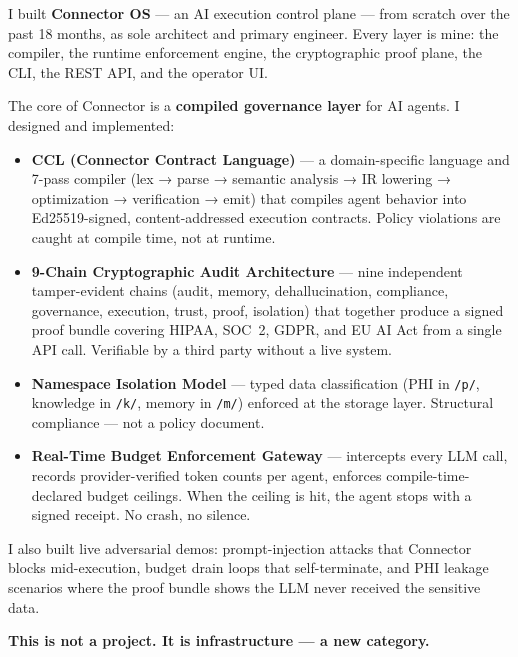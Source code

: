 \documentclass[10pt,a4paper]{article}
\newcommand{\qblock}[2]{%
  \vspace{8pt}
  \noindent
  \begin{tcolorbox}[qbase,
    colback=CSoft,
    title={\small\bfseries\color{CBlue} #1},
    attach boxed title to top left={yshift=-2mm,xshift=6pt},
    boxed title style={colback=CBlue,arc=2pt,boxrule=0pt,
      fonttitle=\small\bfseries\color{white}}]
  #2
  \end{tcolorbox}
}
\begin{document}
\qblock{Q3 — Products you have built and launched, and your role}{

I built \textbf{Connector OS} — an AI execution control plane — from scratch over the past 18
months, as sole architect and primary engineer. Every layer is mine: the compiler, the runtime
enforcement engine, the cryptographic proof plane, the CLI, the REST API, and the operator UI.

The core of Connector is a \textbf{compiled governance layer} for AI agents.
I designed and implemented:

\begin{itemize}
  \item \textbf{CCL (Connector Contract Language)} — a domain-specific language and 7-pass
        compiler (lex → parse → semantic analysis → IR lowering → optimization → verification → emit)
        that compiles agent behavior into Ed25519-signed, content-addressed execution contracts.
        Policy violations are caught at compile time, not at runtime.

  \item \textbf{9-Chain Cryptographic Audit Architecture} — nine independent tamper-evident
        chains (audit, memory, dehallucination, compliance, governance, execution, trust, proof,
        isolation) that together produce a signed proof bundle covering HIPAA, SOC~2, GDPR,
        and EU AI Act from a single API call. Verifiable by a third party without a live system.

  \item \textbf{Namespace Isolation Model} — typed data classification (PHI in \texttt{/p/},
        knowledge in \texttt{/k/}, memory in \texttt{/m/}) enforced at the storage layer.
        Structural compliance — not a policy document.

  \item \textbf{Real-Time Budget Enforcement Gateway} — intercepts every LLM call, records
        provider-verified token counts per agent, enforces compile-time-declared budget ceilings.
        When the ceiling is hit, the agent stops with a signed receipt. No crash, no silence.
\end{itemize}

I also built live adversarial demos: prompt-injection attacks that Connector blocks mid-execution,
budget drain loops that self-terminate, and PHI leakage scenarios where the proof bundle shows
the LLM never received the sensitive data.

\textbf{This is not a project. It is infrastructure — a new category.}

}
\end{document}

